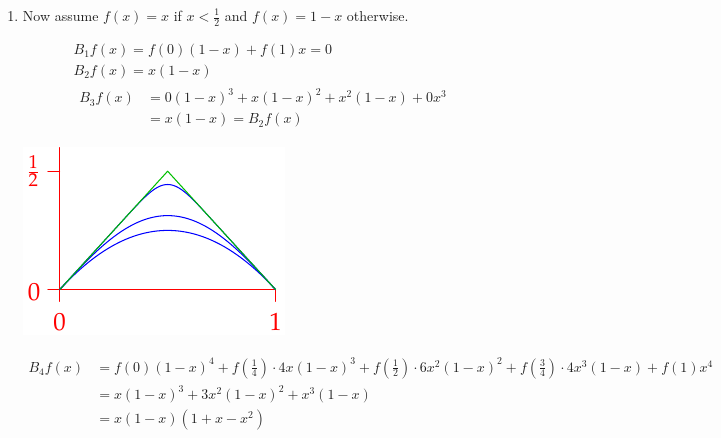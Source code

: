 \begin{examples}{}{}
\begin{enumerate}
	  
	  \item Now assume $f(x)=x$ if $x<\frac 12$ and $f(x)=1-x$ otherwise.\smallbreak
	  \begin{minipage}[t]{0.6\linewidth}\vspace{-20pt}
			\begin{gather*}
	  		B_1f(x)=f(0)(1-x)+f(1)x=0\\[5pt]
	  		B_2f(x)=x(1-x)\\[5pt]
	  		\begin{aligned}
	  			B_3f(x)&=0(1-x)^3+x(1-x)^2+x^2(1-x)+0x^3\\
	  			&=x(1-x)=B_2f(x)
				\end{aligned}
	  	\end{gather*}
		\end{minipage}
		\hfill
		\begin{minipage}[t]{0.39\linewidth}\vspace{-25pt}
			\flushright\includegraphics[scale=0.95]{bernstein2}
		\end{minipage}\par\vspace{-8pt}
	  	\begin{align*}
		  	B_4f(x)&=f(0)(1-x)^4+f(\tfrac 14)\!\cdot\! 4x(1-x)^3+f(\tfrac 12)\!\cdot\! 6x^2(1-x)^2 +f(\tfrac 34)\!\cdot\! 4x^3(1-x)+f(1)x^4\\
		  	&=x(1-x)^3+3x^2(1-x)^2 +x^3(1-x)\\
		  	&=x(1-x)(1+x-x^2)
			\end{align*}
	\end{enumerate}
\end{examples}


\clearpage


\def\ray#1{\overrightarrow{#1}}


